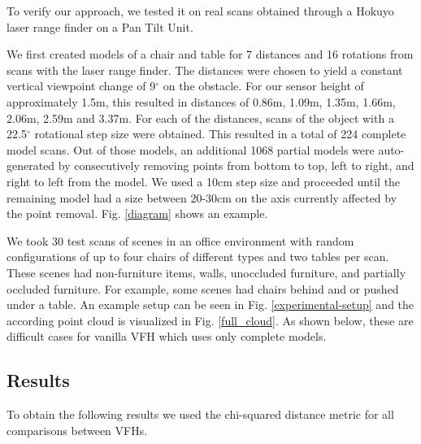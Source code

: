\documentclass[letterpaper, 10pt, conference]{ieeeconf}
\begin{document}
To verify our approach, we tested it on real scans obtained through a Hokuyo
laser range finder on a Pan Tilt Unit. 

We first created models of a chair and table for 7 distances and 16 rotations 
from scans with the laser range finder. The distances were chosen to yield a 
constant vertical viewpoint change of 9$^{\circ}$ on the obstacle. For our
sensor height of approximately 1.5m, this resulted in distances of 0.86m, 1.09m, 1.35m, 1.66m, 2.06m, 2.59m and 3.37m. 
For each of the distances, scans of the object with a 22.5$^{\circ}$ 
rotational step size were obtained. This resulted in a total of 224
complete model scans. Out of those models, an additional 1068 partial models
were auto-generated by consecutively removing
points from bottom to top, left to right, and right to left from the model. We used a 10cm step size and proceeded until the remaining model had a size between 20-30cm on the axis currently affected by the point removal. Fig. \ref{diagram} shows an example.

We took 30 test scans of scenes in an office environment with random configurations of up to four 
chairs of different types and two tables per scan. These scenes had non-furniture items, walls, unoccluded
furniture, and partially occluded furniture. For example, some scenes had chairs behind and or pushed under a table. An example setup can be seen in Fig. \ref{experimental-setup} and the
according point cloud is visualized in Fig. \ref{full_cloud}. As shown below,
these are difficult cases for vanilla VFH which uses only complete models.



\subsection{Results}
To obtain the following results we used the chi-squared distance metric for all
comparisons between VFHs. 
\end{document}
